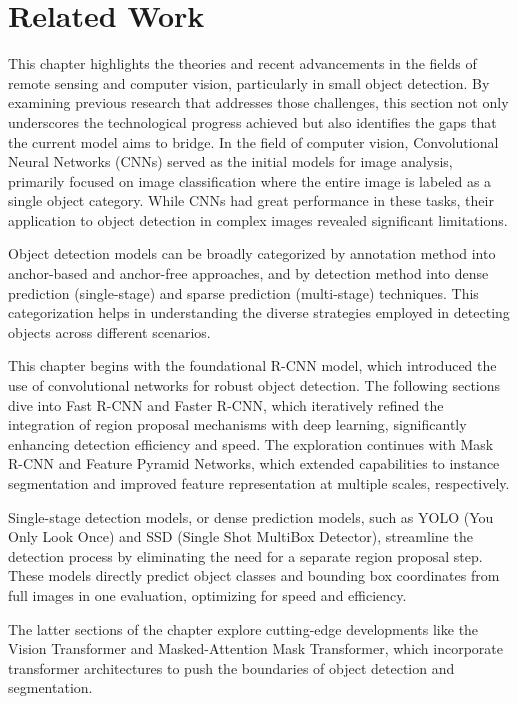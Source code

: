 \chapter{Related Work}

This chapter highlights the theories and recent advancements in the fields of remote sensing and computer vision, particularly in small object detection.
By examining previous research that addresses those challenges, this section not only underscores the technological progress achieved but also identifies 
the gaps that the current model aims to bridge. In the field of computer vision, Convolutional Neural Networks (CNNs) served as the initial models for 
image analysis, primarily focused on image classification where the entire image is labeled as a single object category. While CNNs had great performance 
in these tasks, their application to object detection in complex images revealed significant limitations.

Object detection models can be broadly categorized by annotation method into anchor-based and anchor-free approaches, and by detection method into dense 
prediction (single-stage) and sparse prediction (multi-stage) techniques. This categorization helps in understanding the diverse strategies employed in 
detecting objects across different scenarios.

This chapter begins with the foundational R-CNN model, which introduced the use of convolutional networks for robust object detection. The following sections 
dive into Fast R-CNN and Faster R-CNN, which iteratively refined the integration of region proposal mechanisms with deep learning, significantly enhancing 
detection efficiency and speed. The exploration continues with Mask R-CNN and Feature Pyramid Networks, which extended capabilities to instance segmentation 
and improved feature representation at multiple scales, respectively.

Single-stage detection models, or dense prediction models, such as YOLO (You Only Look Once) and SSD (Single Shot MultiBox Detector), streamline the detection 
process by eliminating the need for a separate region proposal step. These models directly predict object classes and bounding box coordinates from full 
images in one evaluation, optimizing for speed and efficiency.

The latter sections of the chapter explore cutting-edge developments like the Vision Transformer and Masked-Attention Mask Transformer, which incorporate 
transformer architectures to push the boundaries of object detection and segmentation.



